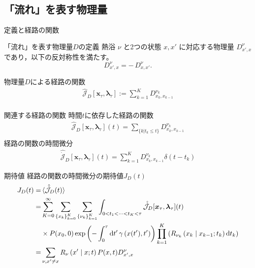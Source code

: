\documentclass{beamer}
\begin{document}
\subsection{「流れ」を表す物理量}
\begin{frame}{定義と経路の関数}
    \begin{block}{「流れ」を表す物理量$D$の定義}
      熱浴 $\nu$ と2つの状態 $x,x'$ に対応する物理量 $D^\nu_{x',x}$ であり，以下の反対称性を満たす。
      \[
        D^\nu_{x',x} = -\,D^\nu_{x,x'}.
      \]
    \end{block}
    物理量$D$による経路の関数
    \begin{align}
      \hat{\mathcal{J}}_D[\bm{x}_\tau,\bm{\lambda}_\tau]:=\sum^K_{k=1}D^{\nu_k}_{x_k,x_{k-1}}\\
    \end{align}
\end{frame}
\begin{frame}[fragile]{関連する経路の関数}
    時間$t$に依存した経路の関数
    \begin{align}
        \hat{\mathcal{J}}_D[\bm{x}_\tau,\bm{\lambda}_\tau](t)=\sum_{\lbrace k|t_k \le t\rbrace}D^{\nu_k}_{x_k,x_{k-1}}\\
    \end{align}
    経路の関数の時間微分
    \begin{align}
        \hat{\dot{\mathcal{J}}}_D[\bm{x}_\tau,\bm{\lambda}_\tau](t)=\sum_{k=1}^K D^{\nu_k}_{x_{k},x_{k-1}}\delta(t-t_k)\label{eq:dotJ}
    \end{align}
\end{frame}
\begin{frame}[fragile]{期待値}
    経路の関数の時間微分の期待値$J_D(t)$
    \begin{align}
        J_D(t)=&\ev*{\hat{\dot{\mathcal{J}}}_D(t)}\\
        =&\sum_{K=0}^{\infty}\sum_{\lbrace x_k\rbrace_{k=0}^K}\sum_{\lbrace\nu_k\rbrace_{k=1}^K}\int_{0<t_1<\cdots<t_K<\tau}\hat{\dot{\mathcal{J}}}_D[\bm{x}_\tau,\bm{\lambda}_\tau](t)\\
        &\times P(x_0,0)\exp\left(-\int_0^\tau \dd{t'}\gamma\left(x(t'),t'\right)\right)\prod_{k=1}^K \left(R_{\nu_k}\left(x_k\mid x_{k-1};t_k\right)\dd{t_k}\right)\\
        =&\sum_{\nu,x'\neq x}R_{\nu}\left(x'\mid x;t\right)P(x,t)D^{\nu}_{x',x}\\
    \end{align}
\end{frame}
\end{document}
